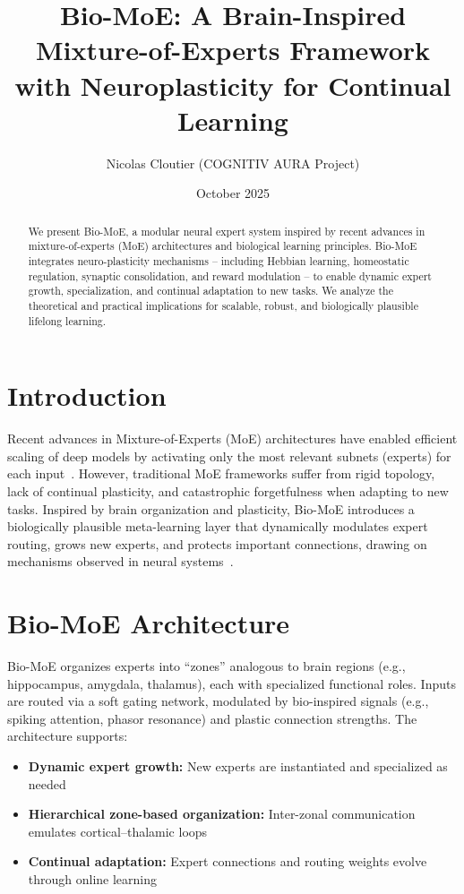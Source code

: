 \documentclass[12pt]{article}
\title{Bio-MoE: A Brain-Inspired Mixture-of-Experts Framework with Neuroplasticity for Continual Learning}
\author{Nicolas Cloutier (COGNITIV AURA Project)}
\date{October 2025}
\begin{document}
\maketitle

\begin{abstract}
We present Bio-MoE, a modular neural expert system inspired by recent advances in mixture-of-experts (MoE) architectures and biological learning principles. Bio-MoE integrates neuro-plasticity mechanisms -- including Hebbian learning, homeostatic regulation, synaptic consolidation, and reward modulation -- to enable dynamic expert growth, specialization, and continual adaptation to new tasks. We analyze the theoretical and practical implications for scalable, robust, and biologically plausible lifelong learning.
\end{abstract}

\section{Introduction}
Recent advances in Mixture-of-Experts (MoE) architectures have enabled efficient scaling of deep models by activating only the most relevant subnets (experts) for each input~\citep{mu2025survey,li2024scaling,oldfield2024factorization}. However, traditional MoE frameworks suffer from rigid topology, lack of continual plasticity, and catastrophic forgetfulness when adapting to new tasks. Inspired by brain organization and plasticity, Bio-MoE introduces a biologically plausible meta-learning layer that dynamically modulates expert routing, grows new experts, and protects important connections, drawing on mechanisms observed in neural systems~\citep{kaiser2020decolle,liu2024neuroplastic,shi2025hybrid}.

\section{Bio-MoE Architecture}
Bio-MoE organizes experts into ``zones'' analogous to brain regions (e.g., hippocampus, amygdala, thalamus), each with specialized functional roles. Inputs are routed via a soft gating network, modulated by bio-inspired signals (e.g., spiking attention, phasor resonance) and plastic connection strengths. The architecture supports:
\begin{itemize}
    \item \textbf{Dynamic expert growth:} New experts are instantiated and specialized as needed
    \item \textbf{Hierarchical zone-based organization:} Inter-zonal communication emulates cortical--thalamic loops
    \item \textbf{Continual adaptation:} Expert connections and routing weights evolve through online learning
\end{itemize}
\end{document}
